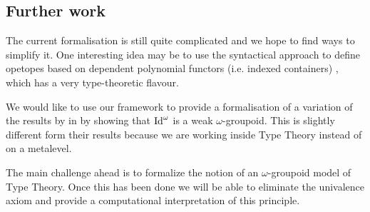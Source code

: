 \subsection{Further work}
The current formalisation is still
quite complicated and we hope to find ways to simplify it. One interesting
idea may be to use the syntactical approach to define opetopes based on
dependent polynomial functors (i.e. indexed containers) \cite{opetopes},
which has a very type-theoretic flavour.  

We would like to use our framework to provide a formalisation of a
variation of the results by in
\cite{lumsdaine10:weak-o-categories,berg08:types-are} by showing that
$\mathrm{Id}^\omega$ is a weak $\omega$-groupoid. This is slightly different form
their results because we are working inside Type Theory instead of on
a metalevel.

The main challenge ahead is to formalize the notion of an
$\omega$-groupoid model of Type Theory. Once this has been done we
will be able to eliminate the univalence axiom and provide a
computational interpretation of this principle.



